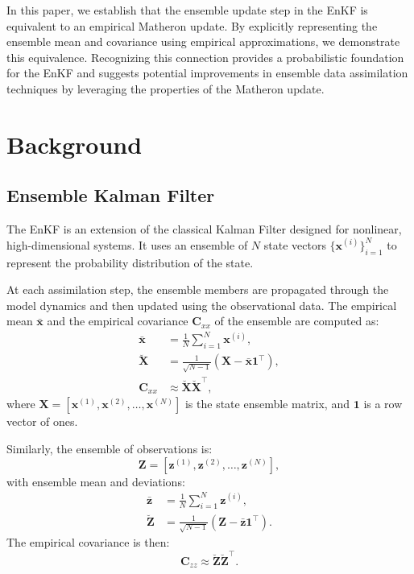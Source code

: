 \documentclass{article}
\theoremstyle{plain}
\begin{document}
In this paper, we establish that the ensemble update step in the EnKF is equivalent to an empirical Matheron update. By explicitly representing the ensemble mean and covariance using empirical approximations, we demonstrate this equivalence. Recognizing this connection provides a probabilistic foundation for the EnKF and suggests potential improvements in ensemble data assimilation techniques by leveraging the properties of the Matheron update.

\section{Background}

\subsection{Ensemble Kalman Filter}

The EnKF is an extension of the classical Kalman Filter designed for nonlinear, high-dimensional systems. It uses an ensemble of $N$ state vectors $\{\mathbf{x}^{(i)}\}_{i=1}^N$ to represent the probability distribution of the state.

At each assimilation step, the ensemble members are propagated through the model dynamics and then updated using the observational data. The empirical mean $\bar{\mathbf{x}}$ and the empirical covariance $\mathbf{C}_{xx}$ of the ensemble are computed as:
\begin{align}
    \bar{\mathbf{x}} &= \frac{1}{N} \sum_{i=1}^N \mathbf{x}^{(i)}, \label{eq:ensemble_mean} \\
    \breve{\mathbf{X}} &= \frac{1}{\sqrt{N-1}} \left( \mathbf{X} - \bar{\mathbf{x}} \mathbf{1}^\top \right), \label{eq:deviation_matrix} \\
    \mathbf{C}_{xx} &\approx \breve{\mathbf{X}} \breve{\mathbf{X}}^\top, \label{eq:ensemble_covariance}
\end{align}
where $\mathbf{X} = [\mathbf{x}^{(1)}, \mathbf{x}^{(2)}, \dots, \mathbf{x}^{(N)}]$ is the state ensemble matrix, and $\mathbf{1}$ is a row vector of ones.

Similarly, the ensemble of observations is:
\begin{equation}
    \mathbf{Z} = [\mathbf{z}^{(1)}, \mathbf{z}^{(2)}, \dots, \mathbf{z}^{(N)}],
\end{equation}
with ensemble mean and deviations:
\begin{align}
    \bar{\mathbf{z}} &= \frac{1}{N} \sum_{i=1}^N \mathbf{z}^{(i)}, \\
    \breve{\mathbf{Z}} &= \frac{1}{\sqrt{N-1}} \left( \mathbf{Z} - \bar{\mathbf{z}} \mathbf{1}^\top \right).
\end{align}
The empirical covariance is then:
\begin{equation}
    \mathbf{C}_{zz} \approx \breve{\mathbf{Z}} \breve{\mathbf{Z}}^\top.
\end{equation}
\end{document}

